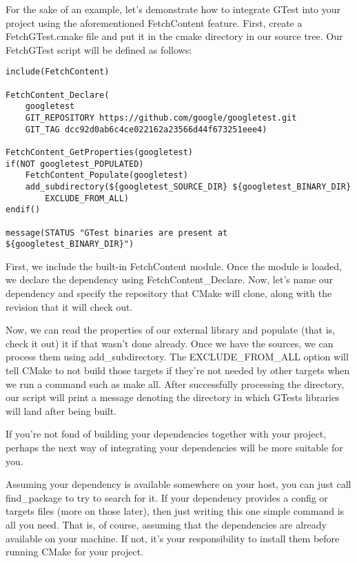 For the sake of an example, let's demonstrate how to integrate GTest into your project using the aforementioned FetchContent feature. First, create a FetchGTest.cmake file and put it in the cmake directory in our source tree. Our FetchGTest script will be defined as follows:

\begin{lstlisting}[style=styleCMake]
include(FetchContent)

FetchContent_Declare(
	googletest
	GIT_REPOSITORY https://github.com/google/googletest.git
	GIT_TAG dcc92d0ab6c4ce022162a23566d44f673251eee4)

FetchContent_GetProperties(googletest)
if(NOT googletest_POPULATED)
	FetchContent_Populate(googletest)
	add_subdirectory(${googletest_SOURCE_DIR} ${googletest_BINARY_DIR}
		EXCLUDE_FROM_ALL)
endif()

message(STATUS "GTest binaries are present at ${googletest_BINARY_DIR}")
\end{lstlisting}

First, we include the built-in FetchContent module. Once the module is loaded, we declare the dependency using FetchContent\_Declare. Now, let's name our dependency and specify the repository that CMake will clone, along with the revision that it will check out.

Now, we can read the properties of our external library and populate (that is, check it out) it if that wasn't done already. Once we have the sources, we can process them using add\_subdirectory. The EXCLUDE\_FROM\_ALL option will tell CMake to not build those targets if they're not needed by other targets when we run a command such as make all. After successfully processing the directory, our script will print a message denoting the directory in which GTests libraries will land after being built.

If you're not fond of building your dependencies together with your project, perhaps the next way of integrating your dependencies will be more suitable for you.


Assuming your dependency is available somewhere on your host, you can just call find\_package to try to search for it. If your dependency provides a config or targets files (more on those later), then just writing this one simple command is all you need. That is, of course, assuming that the dependencies are already available on your machine. If not, it's your responsibility to install them before running CMake for your project.

